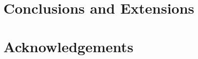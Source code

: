 \documentclass{article}
\begin{document}


\section{Conclusions and Extensions}
\label{sec:conclusions}




\section{Acknowledgements}
\label{sec:conclusions}





\end{document}
